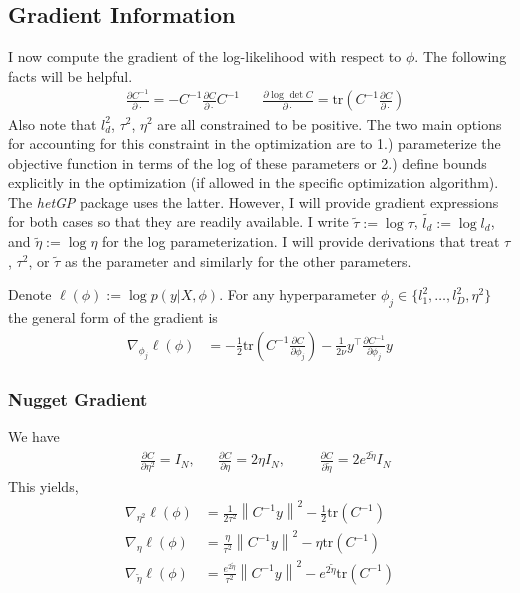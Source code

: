 \documentclass[12pt]{article}
\newcommand*{\norm}[1]{\left\lVert#1\right\rVert}
\begin{document}
\subsection{Gradient Information}
I now compute the gradient of the log-likelihood with respect to $\phi$. The following facts will be helpful. 
\begin{align*}
&\frac{\partial C^{-1}}{\partial \cdot} = -C^{-1} \frac{\partial C}{\partial \cdot} C^{-1} && \frac{\partial \log\det C}{\partial \cdot} = \text{tr}\left(C^{-1} \frac{\partial C}{\partial \cdot} \right)
\end{align*}
Also note that $l_d^2$, $\tau^2$, $\eta^2$ are all constrained to be positive. 
The two main options for accounting for this constraint in the optimization are to 1.) parameterize the 
objective function in terms of the log of these parameters or 2.) define bounds explicitly in the optimization (if allowed in the specific optimization algorithm). The \textit{hetGP} package 
uses the latter. However, I will provide gradient expressions for both cases so that they are readily available. I write 
$\tilde{\tau} := \log \tau$, $\tilde{l_d} := \log l_d$, and $\tilde{\eta} := \log \eta$ for the log parameterization.  
I will provide derivations that treat $\tau$, $\tau^2$, or $\tilde{\tau}$ as the parameter and similarly for the other parameters. 

Denote $\ell(\phi) := \log p(y|X, \phi)$. For any hyperparameter $\phi_j \in \{l^2_1, \dots, l^2_D, \eta^2 \}$ the general form of the gradient is 
\begin{align*}
\nabla_{\phi_j} \ell(\phi) &= -\frac{1}{2} \text{tr}\left(C^{-1} \frac{\partial C}{\partial \phi_j} \right) - \frac{1}{2\nu} y^\top \frac{\partial C^{-1}}{\partial \phi_j} y
\end{align*}

\subsubsection{Nugget Gradient}
We have 
\begin{align*}
&\frac{\partial C}{\partial \eta^2} = I_N, &&\frac{\partial C}{\partial \eta} = 2\eta I_N, &&&\frac{\partial C}{\partial \tilde{\eta}} = 2e^{2\tilde{\eta}} I_N
\end{align*}
This yields, 
\begin{align*}
\nabla_{\eta^2} \ell(\phi) &= \frac{1}{2\tau^2} \norm{C^{-1}y}^2 - \frac{1}{2} \text{tr}(C^{-1}) \\
\nabla_{\eta} \ell(\phi) &= \frac{\eta}{\tau^2} \norm{C^{-1}y}^2 - \eta \text{tr}(C^{-1}) \\
\nabla_{\tilde{\eta}} \ell(\phi) &= \frac{e^{2\tilde{\eta}}}{\tau^2} \norm{C^{-1}y}^2 - e^{2\tilde{\eta}} \text{tr}(C^{-1})
\end{align*}
\end{document}
